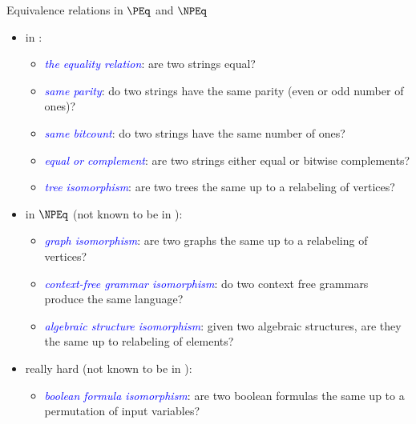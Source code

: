 \documentclass[final]{beamer}
\newcommand{\emphblue}[1]{\emph{\textcolor{blue}{#1}}}
\begin{document}
\begin{frame}{}
\begin{columns}[t]
\begin{column}{.3\linewidth}
      \begin{block}{\LARGE Equivalence relations in $\PEq$ and $\NPEq$}
        \Large
        \begin{itemize}
          \setlength{\itemsep}{20pt}
        \item in \PEq:
          \begin{itemize}\Large
          \item \emphblue{the equality relation}: are two strings equal?
          \item \emphblue{same parity}: do two strings have the same parity (even
            or odd number of ones)?
          \item \emphblue{same bitcount}: do two strings have the same number of
            ones?
          \item \emphblue{equal or complement}: are two strings either equal or
            bitwise complements?
          \item \emphblue{tree isomorphism}: are two trees the same up to a
            relabeling of vertices?
          \end{itemize}
        \item in $\NPEq$ (not known to be in \PEq):
          \begin{itemize}\Large
          \item \emphblue{graph isomorphism}: are two graphs the same up to a
            relabeling of vertices?
          \item \emphblue{context-free grammar isomorphism}: do two context
            free grammars produce the same language?
          \item \emphblue{algebraic structure isomorphism}: given two algebraic
            structures, are they the same up to relabeling of elements?
          \end{itemize}
        \item really hard (not known to be in \NPEq):
          \begin{itemize}\Large
          \item \emphblue{boolean formula isomorphism}: are two boolean
            formulas the same up to a permutation of input variables?
          \end{itemize}
        \end{itemize}
      \end{block}


\end{column}
\end{columns}
\end{frame}
\end{document}
